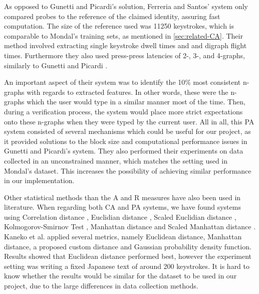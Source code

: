 \documentclass[informationsecurity]{gucmasterproject}
\begin{document}
As opposed to Gunetti and Picardi's solution, Ferreria and Santos' system only compared probes to the reference of the claimed identity, assuring fast computation.
The size of the reference used was 11250 keystrokes, which is comparable to Mondal's training sets, as mentioned in \cref{sec:related-CA}.
Their method involved extracting single keystroke dwell times and and digraph flight times.
Furthermore they also used press-press latencies of 2-, 3-, and 4-graphs, similarly to Gunetti and Picardi \cite{gnp}.

An important aspect of their system was to identify the 10\% most consistent n-graphs with regards to extracted features.
In other words, these were the n-graphs which the user would type in a similar manner most of the time.
Then, during a verification process, the system would place more strict expectations onto these n-graphs when they were typed by the current user.
All in all, this PA system consisted of several mechanisms which could be useful for our project, as it provided solutions to the block size and computational performance issues in Gunetti and Picardi's \cite{gnp} system.
They also performed their experiments on data collected in an unconstrained manner, which matches the setting used in Mondal's \cite{mondal} dataset. 
This increases the possibility of achieving similar performance in our implementation.

Other statistical methods than the A and R measures have also been used in literature.
When regarding both CA and PA systems, we have found systems using Correlation distance \cite{mondal}, Euclidian distance \cite{Kaneko, Monrose}, Scaled Euclidian distance \cite{mondal}, Kolmogorov-Smirnov Test \cite{park}, Manhattan distance \cite{Kaneko} and Scaled Manhattan distance \cite{BOURS201236}.
Kaneko et al. \cite{Kaneko} applied several metrics, namely Euclidean distance, Manhattan distance, a proposed custom distance and Gaussian probability density function. Results showed that Euclidean distance performed best, however the experiment setting was writing a fixed Japanese text of around 200 keystrokes.
It is hard to know whether the results would be similar for the dataset to be used in our project, due to the large differences in data collection methods.
\end{document}

